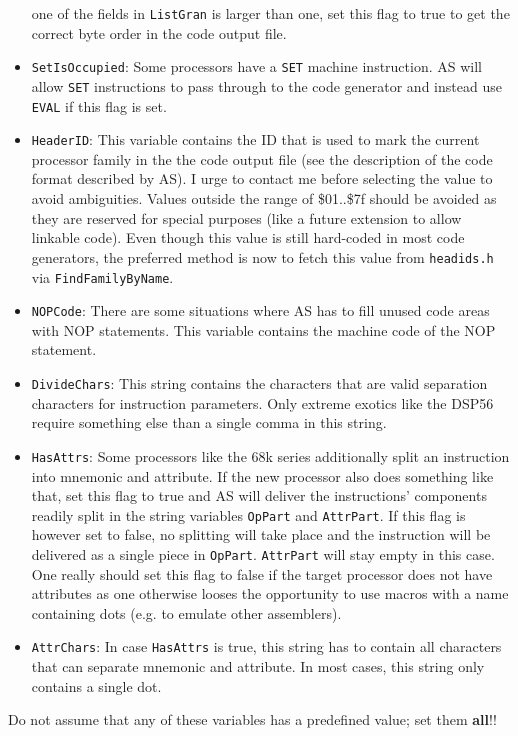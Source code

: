 \documentclass[12pt,twoside]{report}
\newcommand{\bb}[1]{{\bf #1}}
\newcommand{\tty}[1]{{\tt #1}}
\begin{document}
\begin{itemize}
{      one of the fields in \tty{ListGran} is larger than one, set this flag
      to true to get the correct byte order in the code output file.}
\item{\tty{SetIsOccupied}: Some processors have a \tty{SET} machine instruction.
      AS will allow \tty{SET} instructions to pass through to the code
      generator and instead use \tty{EVAL} if this flag is set.}
\item{\tty{HeaderID}: This variable contains the ID that is used to mark the
      current processor family in the the code output file (see the
      description of the code format described by AS).  I urge to
      contact me before selecting the value to avoid ambiguities.
      Values outside the range of \$01..\$7f should be avoided as they
      are reserved for special purposes (like a future extension to
      allow linkable code). Even though this value is still hard-coded
      in most code generators, the preferred method is now to fetch this
      value from {\tt headids.h} via {\tt FindFamilyByName}.}
\item{\tty{NOPCode}: There are some situations where AS has to fill unused
      code areas with NOP statements.  This variable contains the
      machine code of the NOP statement.}
\item{\tty{DivideChars}: This string contains the characters that are valid
      separation characters for instruction parameters.  Only extreme
      exotics like the DSP56 require something else than a single comma
      in this string.}
\item{\tty{HasAttrs}: Some processors like the 68k series additionally split
      an instruction into mnemonic and attribute.  If the new processor
      also does something like that, set this flag to true and AS will
      deliver the instructions' components readily split in the string
      variables \tty{OpPart} and \tty{AttrPart}.  If this flag is however set to
      false, no splitting will take place and the instruction will be
      delivered as a single piece in \tty{OpPart}.  \tty{AttrPart} will stay empty
      in this case.  One really should set this flag to false if the
      target processor does not have attributes as one otherwise looses
      the opportunity to use macros with a name containing dots (e.g.
      to emulate other assemblers).}
\item{\tty{AttrChars}: In case \tty{HasAttrs} is true, this string has to contain 
      all characters that can separate mnemonic and attribute.  In most
      cases, this string only contains a single dot.}
\end{itemize}
Do not assume that any of these variables has a predefined value; set
them \bb{all}!!
\end{document}

